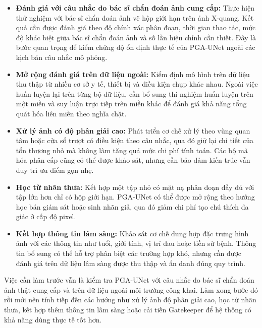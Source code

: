 \begin{itemize}
    \item \textbf{Đánh giá với câu nhắc do bác sĩ chẩn đoán ảnh cung cấp:}
    Thực hiện thử nghiệm với bác sĩ chẩn đoán ảnh vẽ hộp giới hạn trên ảnh X-quang. Kết quả cần được đánh giá theo độ chính xác phân đoạn, thời gian thao tác, mức độ khác biệt giữa bác sĩ chẩn đoán ảnh và số lần hiệu chỉnh cần thiết. Đây là bước quan trọng để kiểm chứng độ ổn định thực tế của PGA-UNet ngoài các kịch bản câu nhắc mô phỏng.

    \item \textbf{Mở rộng đánh giá trên dữ liệu ngoài:}
    Kiểm định mô hình trên dữ liệu thu thập từ nhiều cơ sở y tế, thiết bị và điều kiện chụp khác nhau. Ngoài việc huấn luyện lại trên từng bộ dữ liệu, cần bổ sung thí nghiệm huấn luyện trên một miền và suy luận trực tiếp trên miền khác để đánh giá khả năng tổng quát hóa liên miền theo nghĩa chặt.

    \item \textbf{Xử lý ảnh có độ phân giải cao:}
    Phát triển cơ chế xử lý theo vùng quan tâm hoặc cửa sổ trượt có điều kiện theo câu nhắc, qua đó giữ lại chi tiết của tổn thương nhỏ mà không làm tăng quá mức chi phí tính toán. Các bộ mã hóa phân cấp cũng có thể được khảo sát, nhưng cần bảo đảm kiến trúc vẫn duy trì ưu điểm gọn nhẹ.

    \item \textbf{Học từ nhãn thưa:}
    Kết hợp một tập nhỏ có mặt nạ phân đoạn đầy đủ với tập lớn hơn chỉ có hộp giới hạn. PGA-UNet có thể được mở rộng theo hướng học bán giám sát hoặc sinh nhãn giả, qua đó giảm chi phí tạo chú thích đa giác ở cấp độ pixel.

    \item \textbf{Kết hợp thông tin lâm sàng:}
    Khảo sát cơ chế dung hợp đặc trưng hình ảnh với các thông tin như tuổi, giới tính, vị trí đau hoặc tiền sử bệnh. Thông tin bổ sung có thể hỗ trợ phân biệt các trường hợp khó, nhưng cần được đánh giá trên dữ liệu lâm sàng được thu thập và ẩn danh đúng quy trình.
\end{itemize}

Việc cần làm trước vẫn là kiểm tra PGA-UNet với câu nhắc do bác sĩ chẩn đoán ảnh thật cung cấp và trên dữ liệu ngoài môi trường công khai. Làm xong bước đó rồi mới nên tính tiếp đến các hướng như xử lý ảnh độ phân giải cao, học từ nhãn thưa, kết hợp thêm thông tin lâm sàng hoặc cải tiến Gatekeeper để hệ thống có khả năng dùng thực tế tốt hơn.
